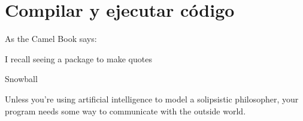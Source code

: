 







\section{Compilar y ejecutar código}


As the Camel Book says:
\epigraph{I recall seeing a package to make quotes}{Snowball}

Unless you're using artificial intelligence to model a solipsistic philosopher, your program needs some way to communicate with the outside world.






% 